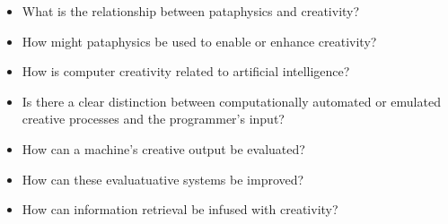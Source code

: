 \begin{itemize}
  \item What is the relationship between pataphysics and creativity?
  \item How might pataphysics be used to enable or enhance creativity?
  \item How is computer creativity related to artificial intelligence?
  \item Is there a clear distinction between computationally automated or emulated creative processes and the programmer's input?
  \item How can a machine's creative output be evaluated?
  \item How can these evaluatuative systems be improved?
  \item How can information retrieval be infused with creativity?
\end{itemize}

